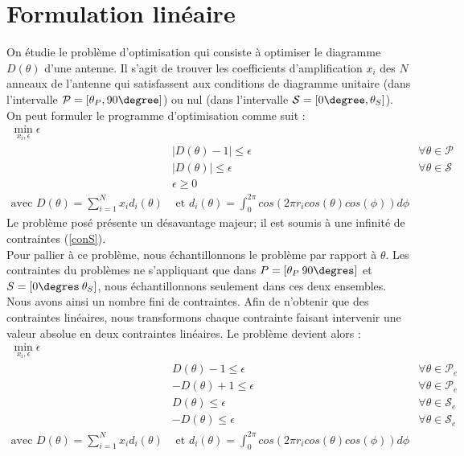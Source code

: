 \section{Formulation linéaire}
On étudie le problème d'optimisation qui consiste à optimiser le diagramme $D(\theta)$ d'une antenne. Il s'agit de trouver les coefficients d'amplification $x_i$ des $N$ anneaux de l'antenne qui satisfassent aux conditions de diagramme unitaire (dans l'intervalle $\mathcal{P}=[\theta_P, 90\degree]$) ou nul (dans l'intervalle $\mathcal{S}=[0 \degree,\theta_S]$). On peut formuler le programme d'optimisation comme suit :
\begin{align}
\min_{x_i,\epsilon} \epsilon & \\
&|D(\theta)-1|  \leq \epsilon &\forall \theta\in \mathcal{P}\\
&|D(\theta)| \leq \epsilon & \forall \theta\in \mathcal{S}\label{conS}\\
& \epsilon \geq 0\\
\text{avec } D(\theta) = \sum_{i=1}^N x_i d_i(\theta) & \text{ et } d_i(\theta) = \int_0^{2 \pi} cos(2 \pi r_i cos(\theta)cos(\phi)) d\phi \label{eq:di}
\end{align}
Le problème posé présente un désavantage majeur; il est soumis à une infinité de contraintes (\ref{conS}).\\
Pour pallier à ce problème, nous échantillonnons le problème par rapport à $\theta$. Les contraintes du problèmes ne s'appliquant que dans $P = [\theta_P\: 90\degres  ]$ et $S = [0\degres \:\theta_S]$, nous échantillonnons seulement dans ces deux ensembles. Nous avons ainsi un nombre fini de contraintes. Afin de n'obtenir que des contraintes linéaires, nous transformons chaque contrainte faisant intervenir une valeur absolue en deux contraintes linéaires. Le problème devient alors : 
\begin{align}
\min_{x_i,\epsilon} \epsilon & & \nonumber\\
& D(\theta)-1\leq \epsilon & \forall \theta\in \mathcal{P}_e \\
& -D(\theta)+1\leq \epsilon & \forall \theta\in \mathcal{P}_e\\
& D(\theta)\leq \epsilon & \forall \theta\in \mathcal{S}_e\\
& -D(\theta)\leq \epsilon &\forall \theta\in \mathcal{S}_e\\
\text{avec } D(\theta) = \sum_{i=1}^N x_i d_i(\theta) & \text{ et } d_i(\theta) = \int_0^{2 \pi} cos(2 \pi r_i cos(\theta)cos(\phi)) d\phi 
\end{align}
